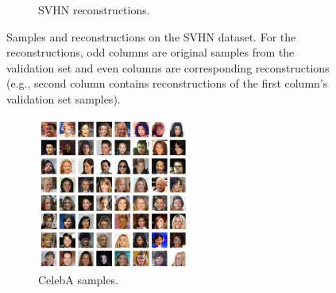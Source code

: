 \documentclass{article}
\newcommand{\figureHeight}{5cm}
\begin{document}
\begin{figure}[p]
\begin{subfigure}[t]{0.49\textwidth}
        \caption{\label{fig:svhn_reconstructions} SVHN reconstructions.}
    \end{subfigure}
    \caption{\label{fig:svhn_images} Samples and reconstructions on the SVHN
        dataset. For the reconstructions, odd columns are
        original samples from the validation set and even columns are
        corresponding reconstructions (e.g., second column contains
        reconstructions of the first column's validation set samples).}
\end{figure}

\begin{figure}[p]
    \centering
    \begin{subfigure}[t]{0.49\textwidth}
        \centering
        \includegraphics[height=\figureHeight]{celeba_samples.png}
        \caption{\label{fig:celeba_samples} CelebA samples.}
    \end{subfigure}
    \hfill
    \begin{subfigure}[t]{0.49\textwidth}
        \centering

\end{subfigure}
\end{figure}
\end{document}
